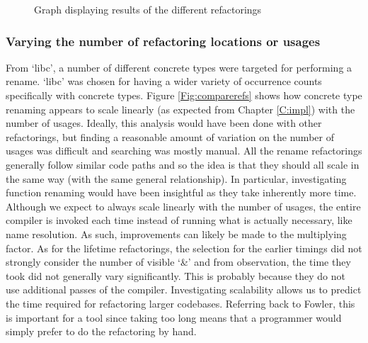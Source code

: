 \begin{figure}[H]
\begin{center}
\caption{Graph displaying results of the different refactorings}
\label{Fig:compareref}
\end{center}
\end{figure}

\subsubsection{Varying the number of refactoring locations or usages}
From `libc', a number of different concrete types were targeted for performing a rename. `libc' was chosen for having a wider variety of occurrence counts specifically with concrete types. Figure \ref{Fig:comparerefs} shows how concrete type renaming appears to scale linearly (as expected from Chapter \ref{C:impl}) with the number of usages. Ideally, this analysis would have been done with other refactorings, but finding a reasonable amount of variation on the number of usages was difficult and searching was mostly manual. All the rename refactorings generally follow similar code paths and so the idea is that they should all scale in the same way (with the same general relationship). In particular, investigating function renaming would have been insightful as they take inherently more time. Although we expect to always scale linearly with the number of usages, the entire compiler is invoked each time instead of running what is actually necessary, like name resolution. As such, improvements can likely be made to the multiplying factor. As for the lifetime refactorings, the selection for the earlier timings did not strongly consider the number of visible `\&' and from observation, the time they took did not generally vary significantly. This is probably because they do not use additional passes of the compiler. Investigating scalability allows us to predict the time required for refactoring larger codebases. Referring back to Fowler, this is important for a tool since taking too long means that a programmer would simply prefer to do the refactoring by hand.


